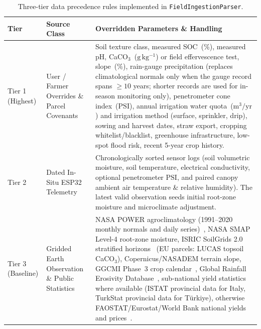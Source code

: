 \begin{table}[h!]
  \centering
  \small
  \caption{Three-tier data precedence rules implemented in \texttt{FieldIngestionParser}.}
  \label{tab:data-layering}
  \begin{tabular}{@{}p{2.2cm}p{4.6cm}p{7.4cm}@{}}
    \toprule
    \textbf{Tier} & \textbf{Source Class} & \textbf{Overridden Parameters \& Handling} \\
    \midrule
    Tier 1 (Highest) & User / Farmer Overrides \& Parcel Covenants & Soil texture class, measured SOC~(\%), measured $\mathrm{pH}$, CaCO$_3$~($\mathrm{g\,kg^{-1}}$) or field effervescence test, slope~(\%), rain-gauge precipitation (replaces climatological normals only when the gauge record spans $\ge 10$ years; shorter records are used for in-season monitoring only), penetrometer cone index~($\mathrm{PSI}$), annual irrigation water quota~($\mathrm{m^3/yr}$) and irrigation method (surface, sprinkler, drip), sowing and harvest dates, straw export, cropping whitelist/blacklist, greenhouse infrastructure, low-spot flood risk, recent 5-year crop history. \\
    \addlinespace
    Tier 2 & Dated In-Situ ESP32 Telemetry & Chronologically sorted sensor logs (soil volumetric moisture, soil temperature, electrical conductivity, optional penetrometer $\mathrm{PSI}$, and paired canopy ambient air temperature \& relative humidity). The latest valid observation seeds initial root-zone moisture and microclimate adjustment. \\
    \addlinespace
    Tier 3 (Baseline) & Gridded Earth Observation \& Public Statistics & NASA POWER agroclimatology (1991--2020 monthly normals and daily series)~\cite{nasapower2024}, NASA SMAP Level-4 root-zone moisture, ISRIC SoilGrids 2.0 stratified horizons~\cite{poggio2021soilgrids} (EU parcels: LUCAS topsoil CaCO$_3$), Copernicus/NASADEM terrain slope, GGCMI Phase~3 crop calendar~\cite{jagermeyr2021calendar}, Global Rainfall Erosivity Database~\cite{panagos2017global}, sub-national yield statistics where available (ISTAT provincial data for Italy, TurkStat provincial data for T{\"u}rkiye), otherwise FAOSTAT/Eurostat/World Bank national yields and prices~\cite{faostat2024}. \\
    \bottomrule
  \end{tabular}
\end{table}

